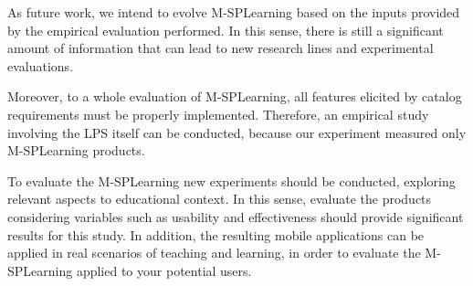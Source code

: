 As future work, we intend to evolve M-SPLear\allowbreak ning based on the inputs provided by the empirical evaluation performed. In this sense, there is still a significant amount of information that can lead to new research lines and experimental evaluations.

Moreover, to a whole evaluation of M-SPLear\allowbreak ning, all features elicited by catalog requirements must be properly implemented. Therefore, an empirical study involving the LPS itself can be conducted, because our experiment measured only M-SPLear\allowbreak ning products.


To evaluate the M-SPLear\allowbreak ning new experiments should be conducted, exploring relevant  aspects to educational context. In this sense, evaluate the products considering variables such as usability and effectiveness should provide significant results for this study. In addition, the resulting mobile applications can be applied in real scenarios of teaching and learning, in order to evaluate the M-SPLear\allowbreak ning applied to your potential users.

